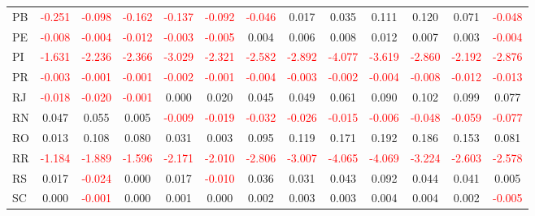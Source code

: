 \documentclass[a4paper, 12pt]{article}
\begin{document}
\begin{table}[H]
{\begin{tabular}{lcccccccccccc}
      PB & \textcolor{red}{-0.251} & \textcolor{red}{-0.098} & \textcolor{red}{-0.162} & \textcolor{red}{-0.137} & \textcolor{red}{-0.092} & \textcolor{red}{-0.046} & 0.017 & 0.035 & 0.111 & 0.120 & 0.071 & \textcolor{red}{-0.048}\\
      PE & \textcolor{red}{-0.008} & \textcolor{red}{-0.004} & \textcolor{red}{-0.012} & \textcolor{red}{-0.003} & \textcolor{red}{-0.005} & 0.004 & 0.006 & 0.008 & 0.012 & 0.007 & 0.003 & \textcolor{red}{-0.004}\\
      PI & \textcolor{red}{-1.631} & \textcolor{red}{-2.236} & \textcolor{red}{-2.366} & \textcolor{red}{-3.029} & \textcolor{red}{-2.321} & \textcolor{red}{-2.582} & \textcolor{red}{-2.892} & \textcolor{red}{-4.077} & \textcolor{red}{-3.619} & \textcolor{red}{-2.860} & \textcolor{red}{-2.192} & \textcolor{red}{-2.876}\\
      PR & \textcolor{red}{-0.003} & \textcolor{red}{-0.001} & \textcolor{red}{-0.001} & \textcolor{red}{-0.002} & \textcolor{red}{-0.001} & \textcolor{red}{-0.004} & \textcolor{red}{-0.003} & \textcolor{red}{-0.002} & \textcolor{red}{-0.004} & \textcolor{red}{-0.008} & \textcolor{red}{-0.012} & \textcolor{red}{-0.013}\\
      RJ & \textcolor{red}{-0.018} & \textcolor{red}{-0.020} & \textcolor{red}{-0.001} & 0.000 & 0.020 & 0.045 & 0.049 & 0.061 & 0.090 & 0.102 & 0.099 & 0.077\\
      RN & 0.047 & 0.055 & 0.005 & \textcolor{red}{-0.009} & \textcolor{red}{-0.019} & \textcolor{red}{-0.032} & \textcolor{red}{-0.026} & \textcolor{red}{-0.015} & \textcolor{red}{-0.006} & \textcolor{red}{-0.048} & \textcolor{red}{-0.059} & \textcolor{red}{-0.077}\\
      RO & 0.013 & 0.108 & 0.080 & 0.031 & 0.003 & 0.095 & 0.119 & 0.171 & 0.192 & 0.186 & 0.153 & 0.081\\
      RR & \textcolor{red}{-1.184} & \textcolor{red}{-1.889} & \textcolor{red}{-1.596} & \textcolor{red}{-2.171} & \textcolor{red}{-2.010} & \textcolor{red}{-2.806} & \textcolor{red}{-3.007} & \textcolor{red}{-4.065} & \textcolor{red}{-4.069} & \textcolor{red}{-3.224} & \textcolor{red}{-2.603} & \textcolor{red}{-2.578}\\
      RS & 0.017 & \textcolor{red}{-0.024} & 0.000 & 0.017 & \textcolor{red}{-0.010} & 0.036 & 0.031 & 0.043 & 0.092 & 0.044 & 0.041 & 0.005\\
      SC & 0.000 & \textcolor{red}{-0.001} & 0.000 & 0.001 & 0.000 & 0.002 & 0.003 & 0.003 & 0.004 & 0.004 & 0.002 & \textcolor{red}{-0.005}\\

\end{tabular}}
\end{table}
\end{document}
